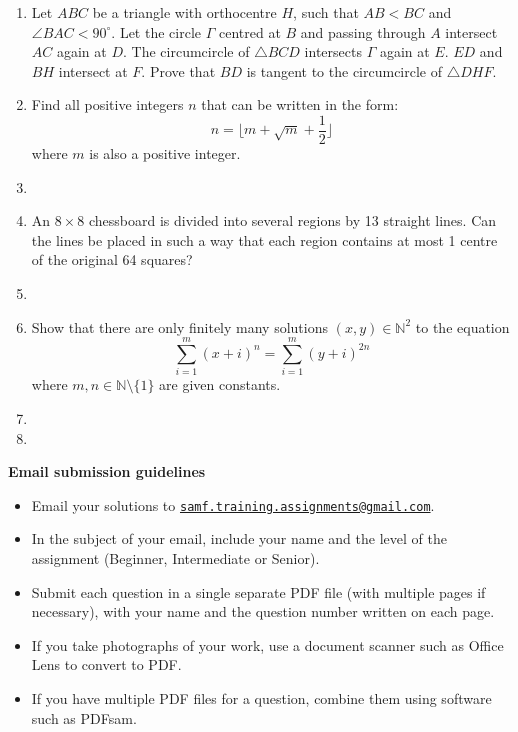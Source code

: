 \documentclass{article}
\begin{document}
\begin{enumerate}

\medskip
\item %
Let $ABC$ be a triangle with orthocentre $H$, such that $AB<BC$ and $\angle BAC < 90^\circ$. Let the circle $\Gamma$ centred at $B$ and passing through $A$ intersect $AC$ again at $D$. The circumcircle of $\triangle BCD$ intersects $\Gamma$ again at $E$. $ED$ and $BH$ intersect at $F$. Prove that $BD$ is tangent to the circumcircle of $\triangle DHF$.


\medskip
\item %
Find all positive integers $n$ that can be written in the form:
$$n = \lfloor m + \sqrt{m} + \frac{1}{2} \rfloor$$
where $m$ is also a positive integer.

\medskip
\item


\medskip
\item
An $8 \times 8$ chessboard is divided into several regions by 13 straight lines. Can the lines be placed in such a way that each region contains at most 1 centre of the original 64 squares?


\medskip
\item


\medskip
\item %
Show that there are only finitely many solutions $(x, y) \in \mathbb{N}^2$ to the equation
$$\sum_{i = 1}^{m} (x + i)^n = \sum_{i = 1}^{m} (y + i)^{2n}$$
where $m, n \in \mathbb{N} \setminus \{1\}$ are given constants.


\medskip
\item




\medskip
\item


\end{enumerate}


\vfill
\textbf{\Large Email submission guidelines}
\begin{itemize}
	\item Email your solutions to \href{mailto:samf.training.assignments@gmail.com}{\texttt{samf.training.assignments@gmail.com}}.
	\item In the subject of your email, include your name and the level of the assignment (Beginner, Intermediate or Senior).
	\item Submit each question in a single separate PDF file (with multiple pages if necessary), with your name and the question number written on each page.
	\item If you take photographs of your work, use a document scanner such as Office Lens to convert to PDF.
	\item If you have multiple PDF files for a question, combine them using software such as PDFsam.
\end{itemize}
\end{document}
